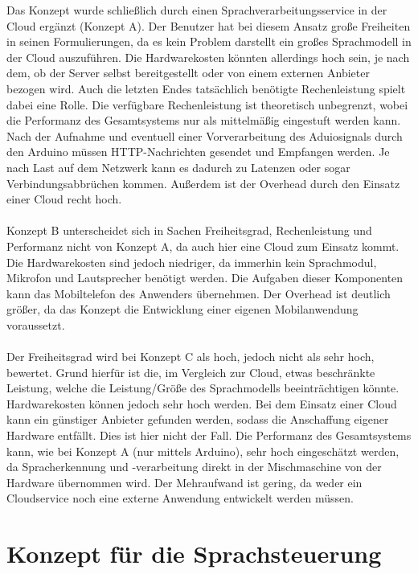 Das Konzept wurde schließlich durch einen Sprachverarbeitungsservice in der Cloud ergänzt (Konzept A).
Der Benutzer hat bei diesem Ansatz große Freiheiten in seinen Formulierungen, da es kein Problem darstellt ein großes Sprachmodell in der Cloud auszuführen.
Die Hardwarekosten könnten allerdings hoch sein, je nach dem, ob der Server selbst bereitgestellt oder von einem externen Anbieter bezogen wird.
Auch die letzten Endes tatsächlich benötigte Rechenleistung spielt dabei eine Rolle.
Die verfügbare Rechenleistung ist theoretisch unbegrenzt, wobei die Performanz des Gesamtsystems nur als mittelmäßig eingestuft werden kann.
Nach der Aufnahme und eventuell einer Vorverarbeitung des Aduiosignals durch den Arduino müssen \ac{HTTP}-Nachrichten gesendet und Empfangen werden.
Je nach Last auf dem Netzwerk kann es dadurch zu Latenzen oder sogar Verbindungsabbrüchen kommen.
Außerdem ist der Overhead durch den Einsatz einer Cloud recht hoch.\\\\
Konzept B unterscheidet sich in Sachen Freiheitsgrad, Rechenleistung und Performanz nicht von Konzept A, da auch hier eine Cloud zum Einsatz kommt.
Die Hardwarekosten sind jedoch niedriger, da immerhin kein Sprachmodul, Mikrofon und Lautsprecher benötigt werden.
Die Aufgaben dieser Komponenten kann das Mobiltelefon des Anwenders übernehmen.
Der Overhead ist deutlich größer, da das Konzept die Entwicklung einer eigenen Mobilanwendung voraussetzt.\\\\
Der Freiheitsgrad wird bei Konzept C als hoch, jedoch nicht als sehr hoch, bewertet.
Grund hierfür ist die, im Vergleich zur Cloud, etwas beschränkte Leistung, welche die Leistung/Größe des Sprachmodells beeinträchtigen könnte.
Hardwarekosten können jedoch sehr hoch werden.
Bei dem Einsatz einer Cloud kann ein günstiger Anbieter gefunden werden, sodass die Anschaffung eigener Hardware entfällt.
Dies ist hier nicht der Fall.
Die Performanz des Gesamtsystems kann, wie bei Konzept A (nur mittels Arduino), sehr hoch eingeschätzt werden, da Spracherkennung und -verarbeitung direkt in der Mischmaschine von der Hardware übernommen wird.
Der Mehraufwand ist gering, da weder ein Cloudservice noch eine externe Anwendung entwickelt werden müssen.
\section{Konzept für die Sprachsteuerung}
